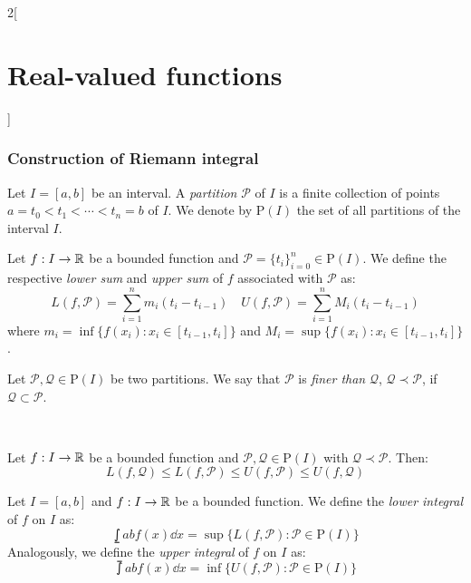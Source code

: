 \documentclass[../../../main_math.tex]{subfiles}
\begin{document}
\begin{multicols}{2}[\section{Real-valued functions}]
  \subsubsection{Construction of Riemann integral}
  \begin{definition}
    Let $I=[a,b]$ be an interval. A \emph{partition} $\mathcal{P}$ of $I$ is a finite collection of points $a=t_0<t_1<\cdots<t_n=b$ of $I$. We denote by $\mathrm{P}(I)$ the set of all partitions of the interval $I$.
  \end{definition}
  \begin{definition}
    Let $f:I\rightarrow\mathbb{R}$ be a bounded function and $\mathcal{P}=\{t_i\}_{i=0}^n\in\mathrm{P}(I)$. We define the respective \emph{lower sum} and \emph{upper sum} of $f$ associated with $\mathcal{P}$ as:
    $$L(f,\mathcal{P})=\sum_{i=1}^nm_i(t_i-t_{i-1})\quad U(f,\mathcal{P})=\sum_{i=1}^nM_i(t_i-t_{i-1})$$
    where $m_i=\inf\{f(x_i):x_i\in[t_{i-1},t_i]\}$ and $M_i=\sup\{f(x_i):x_i\in[t_{i-1},t_i]\}$.
  \end{definition}
  \begin{definition}
    Let $\mathcal{P},\mathcal{Q}\in\mathrm{P}(I)$ be two partitions. We say that $\mathcal{P}$ is \emph{finer than} $\mathcal{Q}$, $\mathcal{Q}\prec\mathcal{P}$, if $\mathcal{Q}\subset\mathcal{P}$.
  \end{definition}
  \begin{center}
    \begin{minipage}{\linewidth}
      \centering
      \\
      
    \end{minipage}
  \end{center}
  \begin{proposition}
    Let $f:I\rightarrow\mathbb{R}$ be a bounded function and $\mathcal{P},\mathcal{Q}\in\mathrm{P}(I)$ with $\mathcal{Q}\prec\mathcal{P}$. Then: $$L(f,\mathcal{Q})\leq L(f,\mathcal{P})\leq U(f,\mathcal{P})\leq U(f,\mathcal{Q})$$
  \end{proposition}
  \begin{definition}
    Let $I=[a,b]$ and $f:I\rightarrow\mathbb{R}$ be a bounded function. We define the \emph{lower integral} of $f$ on $I$ as: $$\lowint{a}{b}f(x)\dd{x}=\sup\{L(f,\mathcal{P}):\mathcal{P}\in\mathrm{P}(I)\}$$ Analogously, we define the \emph{upper integral} of $f$ on $I$ as: $$\upint{a}{b}f(x)\dd{x}=\inf\{U(f,\mathcal{P}):\mathcal{P}\in\mathrm{P}(I)\}$$

\end{definition}
\end{multicols}
\end{document}

